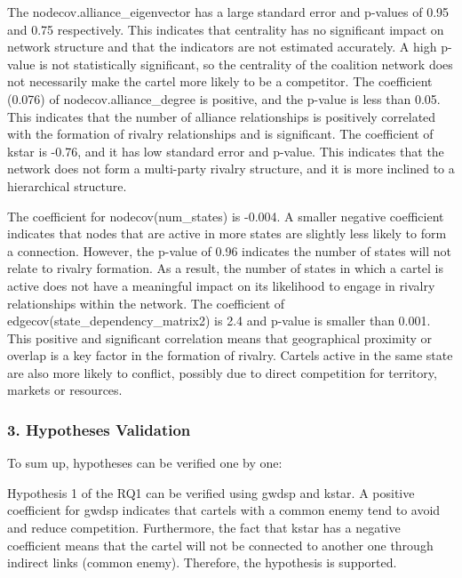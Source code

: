 \documentclass[
]{article}
\begin{document}
The nodecov.alliance\_eigenvector has a large standard error and
p-values of 0.95 and 0.75 respectively. This indicates that centrality
has no significant impact on network structure and that the indicators
are not estimated accurately. A high p-value is not statistically
significant, so the centrality of the coalition network does not
necessarily make the cartel more likely to be a competitor. The
coefficient (0.076) of nodecov.alliance\_degree is positive, and the
p-value is less than 0.05. This indicates that the number of alliance
relationships is positively correlated with the formation of rivalry
relationships and is significant. The coefficient of kstar is -0.76, and
it has low standard error and p-value. This indicates that the network
does not form a multi-party rivalry structure, and it is more inclined
to a hierarchical structure.

The coefficient for nodecov(num\_states) is -0.004. A smaller negative
coefficient indicates that nodes that are active in more states are
slightly less likely to form a connection. However, the p-value of 0.96
indicates the number of states will not relate to rivalry formation. As
a result, the number of states in which a cartel is active does not have
a meaningful impact on its likelihood to engage in rivalry relationships
within the network. The coefficient of
edgecov(state\_dependency\_matrix2) is 2.4 and p-value is smaller than
0.001. This positive and significant correlation means that geographical
proximity or overlap is a key factor in the formation of rivalry.
Cartels active in the same state are also more likely to conflict,
possibly due to direct competition for territory, markets or resources.

\subsubsection{3. Hypotheses Validation}\label{hypotheses-validation}

To sum up, hypotheses can be verified one by one:

Hypothesis 1 of the RQ1 can be verified using gwdsp and kstar. A
positive coefficient for gwdsp indicates that cartels with a common
enemy tend to avoid and reduce competition. Furthermore, the fact that
kstar has a negative coefficient means that the cartel will not be
connected to another one through indirect links (common enemy).
Therefore, the hypothesis is supported.
\end{document}
